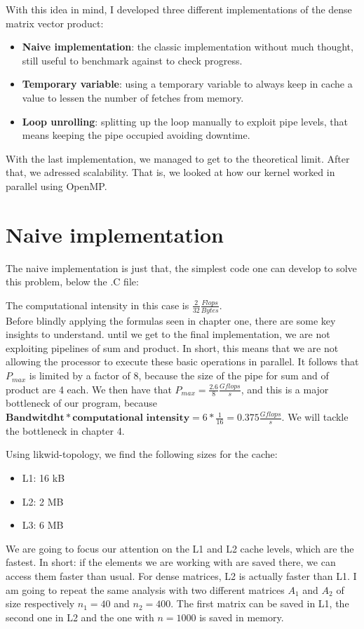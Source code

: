 \documentclass[11pt,a4paper,oneside,titlepage,openright]{book}
\begin{document}
With this idea in mind, I developed three different implementations of the dense matrix vector product:

\begin{itemize}
\item \textbf{Naive implementation}: the classic implementation without much thought, still useful to benchmark against to check progress. 
\item \textbf{Temporary variable}: using a temporary variable to always keep in cache a value to lessen the number of fetches from memory. 
\item \textbf{Loop unrolling}: splitting up the loop manually to exploit pipe levels, that means keeping the pipe occupied avoiding  downtime. 
\end{itemize}

With the last implementation, we managed to get to the theoretical limit. After that, we adressed scalability. That is, we looked at how our kernel worked in parallel using OpenMP.




\chapter{Naive implementation}

The naive implementation is just that, the simplest code one can develop to solve this problem, below the .C file:

The computational intensity in this case is $\frac{2}{32}\frac{Flops}{Bytes}$. 
\\Before blindly applying the formulas seen in chapter one, there are some key insights to understand. until we get to the final implementation, we are not exploiting pipelines of sum and product. In short, this means that we are not allowing the processor to execute these basic operations in parallel. It follows that $P_{max}$ is limited by a factor of $8$, because the size of the pipe for sum and of product are 4 each.
We then have that $P_{max}= \frac{2.6}{8} \frac{Gflops}{s} $, and this is a major bottleneck of our program, because $\textbf{Bandwitdht} * \textbf{computational intensity} = 6*\frac{1}{16} = 0.375 \frac{Gflops}{s} $. We will tackle the bottleneck in chapter 4.

Using likwid-topology, we find the following sizes for the cache: 
\begin{itemize}
\item L1: 16 kB
\item L2: 2 MB
\item L3: 6 MB
\end{itemize}
We are going to focus our attention on the L1 and L2 cache levels, which are the fastest. In short: if the elements we are working with are saved there, we can access them faster than usual.  For dense matrices, L2 is actually faster than L1. I am going to repeat the same analysis with two different matrices $A_1$ and $A_2$ of size respectively $n_1 = 40$ and  $n_2 = 400$.  The first matrix can be saved in L1, the second one in L2 and the one with $n=1000$ is saved in memory.  
\end{document}
